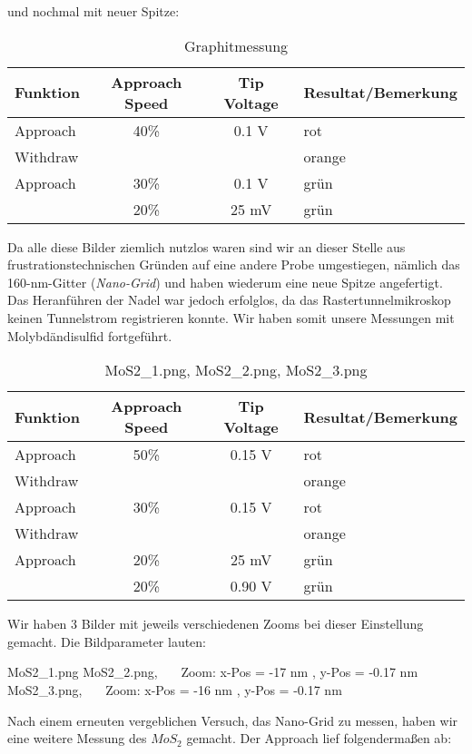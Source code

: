 und nochmal mit neuer Spitze:

\begin{table}[H]
\caption{Graphitmessung}
\centering \begin{tabular}[H]{l c c l} 
Funktion & Approach Speed & Tip Voltage & Resultat/Bemerkung\\ \hline
Approach & 40\% & 0.1 V & rot\\
Withdraw & & & orange\\
Approach & 30\% & 0.1 V & grün\\
 & 20\% & 25 mV & grün\\
\end{tabular}
\end{table}


Da alle diese Bilder ziemlich nutzlos waren sind wir an dieser Stelle aus frustrationstechnischen Gründen auf eine andere Probe umgestiegen, nämlich das 160-nm-Gitter (\emph{Nano-Grid}) und haben wiederum eine neue Spitze angefertigt. Das Heranführen der Nadel war jedoch erfolglos, da das Rastertunnelmikroskop keinen Tunnelstrom registrieren konnte. Wir haben somit unsere Messungen mit Molybdändisulfid fortgeführt.

\begin{table}[H]
\caption{MoS2\_1.png, MoS2\_2.png, MoS2\_3.png}
\centering \begin{tabular}[H]{l c c l} 
Funktion & Approach Speed & Tip Voltage & Resultat/Bemerkung\\ \hline
Approach & 50\% & 0.15 V & rot\\
Withdraw & & & orange\\
Approach & 30\% & 0.15 V & rot\\
Withdraw & & & orange\\
Approach & 20\% & 25 mV & grün\\
 & 20\% & 0.90 V & grün\\
\end{tabular}
\end{table}

Wir haben 3 Bilder mit jeweils verschiedenen Zooms bei dieser Einstellung gemacht. Die Bildparameter lauten:

MoS2\_1.png 
MoS2\_2.png, \ \ \ Zoom: x-Pos = -17 nm , y-Pos = -0.17 nm 
MoS2\_3.png, \ \ \ Zoom: x-Pos = -16 nm , y-Pos = -0.17 nm 

Nach einem erneuten vergeblichen Versuch, das Nano-Grid zu messen, haben wir eine weitere Messung des $MoS_2$ gemacht. Der Approach lief folgendermaßen ab:

